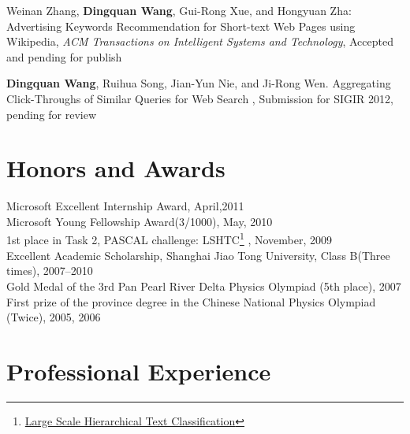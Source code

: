 \documentclass[margin,line]{res}
\begin{document}
\begin{resume}
Weinan Zhang, \textbf{Dingquan Wang}, Gui-Rong Xue, and Hongyuan Zha:
Advertising Keywords Recommendation for Short-text Web Pages using Wikipedia,
\emph{ACM Transactions on Intelligent Systems and Technology}, Accepted and pending for publish 


\textbf{Dingquan Wang}, Ruihua Song, Jian-Yun Nie, and Ji-Rong Wen. Aggregating Click-Throughs of Similar Queries for Web Search , Submission for SIGIR 2012, pending for review

\section{\sc Honors and Awards} 
Microsoft Excellent Internship Award, April,2011 \\
Microsoft Young Fellowship Award(3/1000), May, 2010\\
1st place in Task 2, PASCAL challenge: LSHTC\footnote {\href{http://lshtc.iit.demokritos.gr/}{Large Scale Hierarchical Text Classification}} , November, 2009 \\
Excellent Academic Scholarship, Shanghai Jiao Tong University, Class B(Three times), 2007--2010\\
Gold Medal of the 3rd Pan Pearl River Delta Physics Olympiad (5th place), 2007\\
First prize of the province degree in the Chinese National Physics Olympiad (Twice), 2005, 2006 \\
%
\vspace*{-2.5mm}

\section{\sc Professional Experience}


\end{resume}
\end{document}
